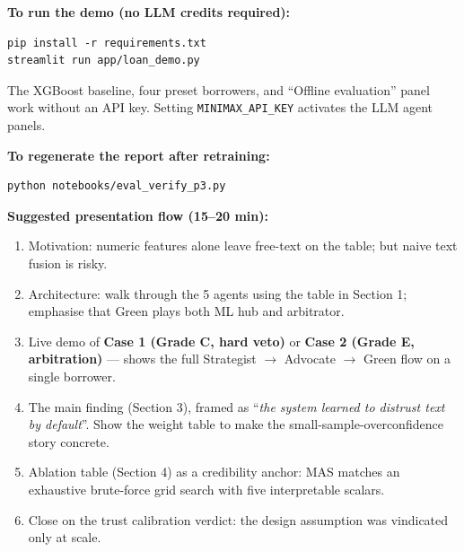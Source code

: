 \documentclass[11pt,letterpaper]{article}
\begin{document}
\textbf{To run the demo (no LLM credits required):}
\begin{verbatim}
pip install -r requirements.txt
streamlit run app/loan_demo.py
\end{verbatim}
The XGBoost baseline, four preset borrowers, and ``Offline evaluation''
panel work without an API key. Setting \texttt{MINIMAX\_API\_KEY}
activates the LLM agent panels.

\textbf{To regenerate the report after retraining:}
\begin{verbatim}
python notebooks/eval_verify_p3.py
\end{verbatim}

\textbf{Suggested presentation flow (15--20 min):}
\begin{enumerate}
  \item Motivation: numeric features alone leave free-text on the table;
        but naive text fusion is risky.
  \item Architecture: walk through the 5 agents using the table in
        Section 1; emphasise that Green plays both ML hub and arbitrator.
  \item Live demo of \textbf{Case 1 (Grade C, hard veto)} or
        \textbf{Case 2 (Grade E, arbitration)} --- shows the full
        Strategist $\rightarrow$ Advocate $\rightarrow$ Green flow on a
        single borrower.
  \item The main finding (Section 3), framed as
        ``\textit{the system learned to distrust text by default}''. Show
        the weight table to make the small-sample-overconfidence story
        concrete.
  \item Ablation table (Section 4) as a credibility anchor: MAS matches
        an exhaustive brute-force grid search with five interpretable
        scalars.
  \item Close on the trust calibration verdict: the design assumption
        was vindicated only at scale.
\end{enumerate}
\end{document}
